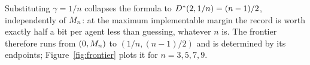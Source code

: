 \begin{remark}[Endpoint]
\label{rem:endpoint}
Substituting $\gamma = 1/n$ collapses the formula to $D^\ast(2,1/n) = (n-1)/2$,
independently of $M_n$: at the maximum implementable margin the record is worth
exactly half a bit per agent less than guessing, whatever $n$ is. The frontier therefore runs from $(0,M_n)$ to $(1/n,(n-1)/2)$ and is
determined by its endpoints; Figure~\ref{fig:frontier} plots it for
$n = 3,5,7,9$.
\end{remark}
